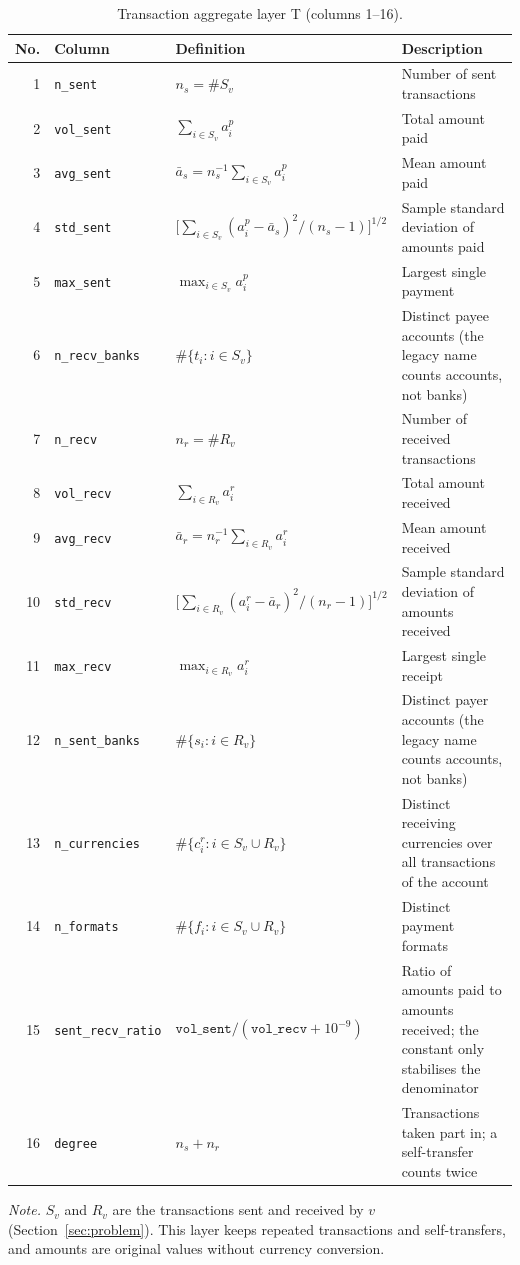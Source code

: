 \begin{table}[htbp]
\centering
\footnotesize
\caption{Transaction aggregate layer T (columns 1--16).}
\label{tab:dict-t}
\setlength{\tabcolsep}{4pt}
\begin{threeparttable}
\begin{tabular}{@{}rL{3.05cm}L{4.6cm}L{6.6cm}@{}}
\toprule
No. & Column & Definition & Description \\
 & \texttt{n\_sent} & $n_s=\#S_v$ & Number of sent transactions \\
2 & \texttt{vol\_sent} & $\sum_{i\in S_v}a_i^{p}$ & Total amount paid \\
3 & \texttt{avg\_sent} & $\bar a_s=n_s^{-1}\sum_{i\in S_v}a_i^{p}$ & Mean amount paid \\
4 & \texttt{std\_sent} & $\bigl[\sum_{i\in S_v}(a_i^{p}-\bar a_s)^2/(n_s-1)\bigr]^{1/2}$ & Sample standard deviation of amounts paid \\
5 & \texttt{max\_sent} & $\max_{i\in S_v}a_i^{p}$ & Largest single payment \\
6 & \texttt{n\_recv\_banks} & $\#\{t_i:i\in S_v\}$ & Distinct payee accounts (the legacy name counts accounts, not banks) \\
7 & \texttt{n\_recv} & $n_r=\#R_v$ & Number of received transactions \\
8 & \texttt{vol\_recv} & $\sum_{i\in R_v}a_i^{r}$ & Total amount received \\
9 & \texttt{avg\_recv} & $\bar a_r=n_r^{-1}\sum_{i\in R_v}a_i^{r}$ & Mean amount received \\
10 & \texttt{std\_recv} & $\bigl[\sum_{i\in R_v}(a_i^{r}-\bar a_r)^2/(n_r-1)\bigr]^{1/2}$ & Sample standard deviation of amounts received \\
11 & \texttt{max\_recv} & $\max_{i\in R_v}a_i^{r}$ & Largest single receipt \\
12 & \texttt{n\_sent\_banks} & $\#\{s_i:i\in R_v\}$ & Distinct payer accounts (the legacy name counts accounts, not banks) \\
13 & \texttt{n\_currencies} & $\#\{c_i^{r}:i\in S_v\cup R_v\}$ & Distinct receiving currencies over all transactions of the account \\
14 & \texttt{n\_formats} & $\#\{f_i:i\in S_v\cup R_v\}$ & Distinct payment formats \\
15 & \texttt{sent\_recv\_ratio} & $\texttt{vol\_sent}/(\texttt{vol\_recv}+10^{-9})$ & Ratio of amounts paid to amounts received; the constant only stabilises the denominator \\
16 & \texttt{degree} & $n_s+n_r$ & Transactions taken part in; a self-transfer counts twice \\
\bottomrule
\end{tabular}
\begin{tablenotes}[flushleft]
\footnotesize
\setlength{\labelsep}{0pt}\item[] \textit{Note.} $S_v$ and $R_v$ are the transactions sent and received by $v$ (Section~\ref{sec:problem}). This layer keeps repeated transactions and self-transfers, and amounts are original values without currency conversion.
\end{tablenotes}
\end{threeparttable}
\end{table}
